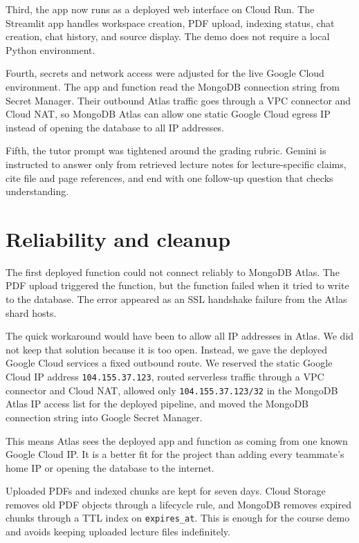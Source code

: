 \documentclass[11pt,a4paper]{article}
\begin{document}
Third, the app now runs as a deployed web interface on Cloud Run. The Streamlit app handles workspace creation, PDF upload, indexing status, chat creation, chat history, and source display. The demo does not require a local Python environment.

Fourth, secrets and network access were adjusted for the live Google Cloud environment. The app and function read the MongoDB connection string from Secret Manager. Their outbound Atlas traffic goes through a VPC connector and Cloud NAT, so MongoDB Atlas can allow one static Google Cloud egress IP instead of opening the database to all IP addresses.

Fifth, the tutor prompt was tightened around the grading rubric. Gemini is instructed to answer only from retrieved lecture notes for lecture-specific claims, cite file and page references, and end with one follow-up question that checks understanding.

\section*{Reliability and cleanup}

The first deployed function could not connect reliably to MongoDB Atlas. The PDF upload triggered the function, but the function failed when it tried to write to the database. The error appeared as an SSL handshake failure from the Atlas shard hosts.

The quick workaround would have been to allow all IP addresses in Atlas. We did not keep that solution because it is too open. Instead, we gave the deployed Google Cloud services a fixed outbound route. We reserved the static Google Cloud IP address \texttt{104.155.37.123}, routed serverless traffic through a VPC connector and Cloud NAT, allowed only \texttt{104.155.37.123/32} in the MongoDB Atlas IP access list for the deployed pipeline, and moved the MongoDB connection string into Google Secret Manager.

This means Atlas sees the deployed app and function as coming from one known Google Cloud IP. It is a better fit for the project than adding every teammate's home IP or opening the database to the internet.

Uploaded PDFs and indexed chunks are kept for seven days. Cloud Storage removes old PDF objects through a lifecycle rule, and MongoDB removes expired chunks through a TTL index on \texttt{expires\_at}. This is enough for the course demo and avoids keeping uploaded lecture files indefinitely.
\end{document}
